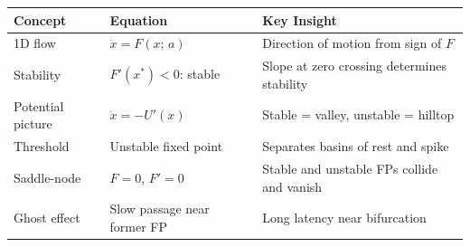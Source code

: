 \begin{chaptersummary}

\begin{center}
\renewcommand{\arraystretch}{1.6}
\begin{tabularx}{\textwidth}{@{}l X X@{}}
  \toprule
  \textbf{Concept} & \textbf{Equation} & \textbf{Key Insight} \\
  \midrule
  1D flow &
  $\dot{x} = F(x;\, a)$ &
  Direction of motion from sign of $F$ \\
  Stability &
  $F'(x^*) < 0$: stable &
  Slope at zero crossing determines stability \\
  Potential picture &
  $\dot{x} = -U'(x)$ &
  Stable = valley, unstable = hilltop \\
  Threshold &
  Unstable fixed point &
  Separates basins of rest and spike \\
  Saddle-node &
  $F = 0$, $F' = 0$ &
  Stable and unstable FPs collide and vanish \\
  Ghost effect &
  Slow passage near former FP &
  Long latency near bifurcation \\
  \bottomrule
\end{tabularx}
\end{center}

\end{chaptersummary}

